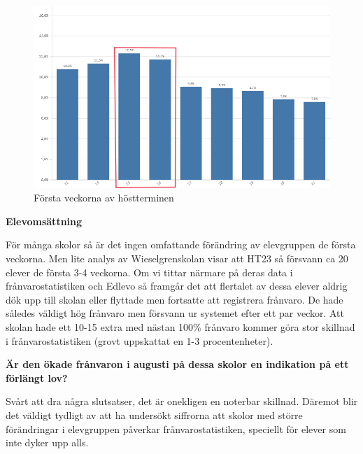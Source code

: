 \documentclass[
  letterpaper,
  DIV=11,
  numbers=noendperiod]{scrartcl}
\begin{document}
\begin{figure}[H]

{\centering \includegraphics{firstweeks.png}

}

\caption{Första veckorna av höstterminen}

\end{figure}%

\textbf{Elevomsättning}

För många skolor så är det ingen omfattande förändring av elevgruppen de
första veckorna. Men lite analys av Wieselgrenskolan visar att HT23 så
försvann ca 20 elever de första 3-4 veckorna. Om vi tittar närmare på
deras data i frånvarostatistiken och Edlevo så framgår det att flertalet
av dessa elever aldrig dök upp till skolan eller flyttade men fortsatte
att registrera frånvaro. De hade således väldigt hög frånvaro men
försvann ur systemet efter ett par veckor. Att skolan hade ett 10-15
extra med nästan 100\% frånvaro kommer göra stor skillnad i
frånvarostatistiken (grovt uppskattat en 1-3 procentenheter).

\textbf{Är den ökade frånvaron i augusti på dessa skolor en indikation
på ett förlängt lov?}

Svårt att dra några slutsatser, det är onekligen en noterbar skillnad.
Däremot blir det väldigt tydligt av att ha undersökt siffrorna att
skolor med större förändringar i elevgruppen påverkar
frånvarostatistiken, speciellt för elever som inte dyker upp alls.
\end{document}
